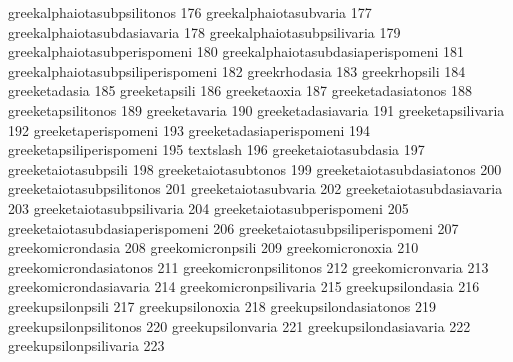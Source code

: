  greekalphaiotasubpsilitonos       176
 greekalphaiotasubvaria            177
 greekalphaiotasubdasiavaria       178
 greekalphaiotasubpsilivaria       179
 greekalphaiotasubperispomeni      180
 greekalphaiotasubdasiaperispomeni 181
 greekalphaiotasubpsiliperispomeni 182
 greekrhodasia                     183
 greekrhopsili                     184
 greeketadasia                     185
 greeketapsili                     186
 greeketaoxia                      187
 greeketadasiatonos                188
 greeketapsilitonos                189
 greeketavaria                     190
 greeketadasiavaria                191
 greeketapsilivaria                192
 greeketaperispomeni               193
 greeketadasiaperispomeni          194
 greeketapsiliperispomeni          195
 textslash                         196
 greeketaiotasubdasia              197
 greeketaiotasubpsili              198
 greeketaiotasubtonos              199
 greeketaiotasubdasiatonos         200
 greeketaiotasubpsilitonos         201
 greeketaiotasubvaria              202
 greeketaiotasubdasiavaria         203
 greeketaiotasubpsilivaria         204
 greeketaiotasubperispomeni        205
 greeketaiotasubdasiaperispomeni   206
 greeketaiotasubpsiliperispomeni   207
 greekomicrondasia                 208
 greekomicronpsili                 209
 greekomicronoxia                  210
 greekomicrondasiatonos            211
 greekomicronpsilitonos            212
 greekomicronvaria                 213
 greekomicrondasiavaria            214
 greekomicronpsilivaria            215
 greekupsilondasia                 216
 greekupsilonpsili                 217
 greekupsilonoxia                  218
 greekupsilondasiatonos            219
 greekupsilonpsilitonos            220
 greekupsilonvaria                 221
 greekupsilondasiavaria            222
 greekupsilonpsilivaria            223
